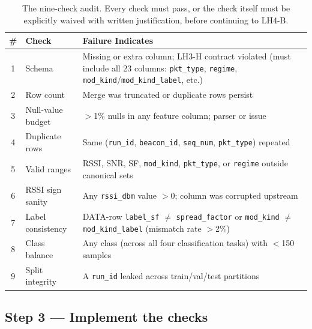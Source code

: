 \documentclass[11pt,letterpaper]{article}
\begin{document}
\begin{table}[h!]
	\centering
	\renewcommand{\arraystretch}{1.3}
	\begin{tabularx}{\textwidth}{c l X}
		\toprule
		\textbf{\#} & \textbf{Check} & \textbf{Failure Indicates} \\
		\midrule
		1  & Schema                & Missing or extra column; LH3-H contract violated (must include all 23 columns: \texttt{pkt\_type}, \texttt{regime}, \texttt{mod\_kind}/\texttt{mod\_kind\_label}, etc.) \\
		2  & Row count             & Merge was truncated or duplicate rows persist \\
		3  & Null-value budget     & $>$1\% nulls in any feature column; parser or \UART{} issue \\
		4  & Duplicate rows        & Same (\texttt{run\_id}, \texttt{beacon\_id}, \texttt{seq\_num}, \texttt{pkt\_type}) repeated \\
		5  & Valid ranges          & \mbox{RSSI}, \mbox{SNR}, SF, \texttt{mod\_kind}, \texttt{pkt\_type}, or \texttt{regime} outside canonical sets \\
		6  & RSSI sign sanity      & Any \texttt{rssi\_dbm} value $> 0$; column was corrupted upstream \\
		7  & Label consistency     & DATA-row \texttt{label\_sf} $\neq$ \texttt{spread\_factor} or \texttt{mod\_kind} $\neq$ \texttt{mod\_kind\_label} (mismatch rate $>$2\%) \\
		8  & Class balance         & Any class (across all four classification tasks) with $<$150 samples \\
		9  & Split integrity       & A \texttt{run\_id} leaked across train/val/test partitions \\
		\bottomrule
	\end{tabularx}
	\caption{The nine-check audit. Every check must pass, or the check itself must be explicitly waived with written justification, before continuing to LH4-B.}
\end{table}

\subsection{Step 3 --- Implement the checks}
\end{document}
